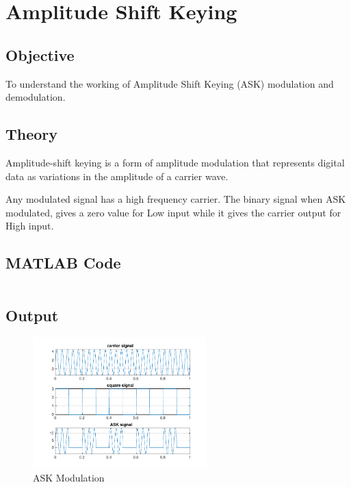 \pagebreak

\section{Amplitude Shift Keying}
\label{sec:ask}

\subsection{Objective}
\label{sub:ask:Objective}
To understand the working of Amplitude Shift Keying (ASK) modulation and demodulation.

\subsection{Theory}
\label{sec:ask:theory}

Amplitude-shift keying is a form of amplitude modulation that represents digital data as variations in the amplitude of a carrier wave.

Any modulated signal has a high frequency carrier. The binary signal when ASK modulated, gives a zero value for Low input while it gives the carrier output for High input.


\subsection{MATLAB Code}
\label{sec:ask:matlab}

\inputminted[fontsize=\footnotesize,autogobble]{matlab}{code/ask.m}

\pagebreak
\subsection{Output}

\begin{figure}[ht]
	\centering
	\includegraphics[width=0.6\textwidth]{res/figures/ASK.pdf}
	\caption{ASK Modulation}
	\label{fig:ask}
\end{figure}

